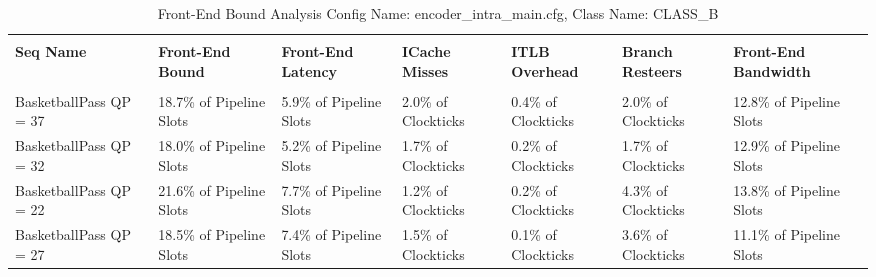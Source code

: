 \documentclass{article}%
\begin{document}
\begin{longtabu}{| X[l] | X[l] | X[l] | X[l] | X[l] | X[l] | X[l] |}%
\caption{%
Front{-}End Bound Analysis\newline%
 Config Name: encoder\_intra\_main.cfg,\newline%
 Class Name: CLASS\_B\newline%
%
}%
\hline%
&&&&&&\\%
\textbf{Seq Name}&\textbf{Front{-}End Bound}&\textbf{Front{-}End Latency}&\textbf{ICache Misses}&\textbf{ITLB Overhead}&\textbf{Branch Resteers}&\textbf{Front{-}End Bandwidth}\\%
&&&&&&\\%
\hline%
\endhead%
BasketballPass\newline%
 QP = 37&18.7\% of Pipeline Slots&5.9\% of Pipeline Slots&2.0\% of Clockticks&0.4\% of Clockticks&2.0\% of Clockticks&12.8\% of Pipeline Slots\\%
\hline%
BasketballPass\newline%
 QP = 32&18.0\% of Pipeline Slots&5.2\% of Pipeline Slots&1.7\% of Clockticks&0.2\% of Clockticks&1.7\% of Clockticks&12.9\% of Pipeline Slots\\%
\hline%
BasketballPass\newline%
 QP = 22&21.6\% of Pipeline Slots&7.7\% of Pipeline Slots&1.2\% of Clockticks&0.2\% of Clockticks&4.3\% of Clockticks&13.8\% of Pipeline Slots\\%
\hline%
BasketballPass\newline%
 QP = 27&18.5\% of Pipeline Slots&7.4\% of Pipeline Slots&1.5\% of Clockticks&0.1\% of Clockticks&3.6\% of Clockticks&11.1\% of Pipeline Slots\\%
\hline%
\end{longtabu}%
\newpage%
\end{document}
